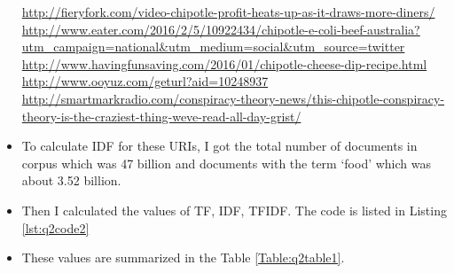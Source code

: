 \begin{itemize}
{\url{http://fieryfork.com/video-chipotle-profit-heats-up-as-it-draws-more-diners/}}\\
{\url{http://www.eater.com/2016/2/5/10922434/chipotle-e-coli-beef-australia?utm_campaign=national&utm_medium=social&utm_source=twitter}}\\
{\url{http://www.havingfunsaving.com/2016/01/chipotle-cheese-dip-recipe.html}}\\
{\url{http://www.ooyuz.com/geturl?aid=10248937}}\\
{\url{http://smartmarkradio.com/conspiracy-theory-news/this-chipotle-conspiracy-theory-is-the-craziest-thing-weve-read-all-day-grist/}}
\item To calculate IDF for these URIs, I got the total number of documents in corpus which was 47 billion and documents with the term `food' which was about 3.52 billion.
\item Then I calculated the values of TF, IDF, TFIDF. The code is listed in Listing \ref{lst:q2code2}
\item These values are summarized in the Table \ref{Table:q2table1}.
\end{itemize}

